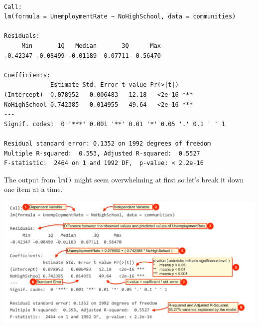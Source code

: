 \documentclass[]{article}
\begin{document}
\begin{verbatim}

Call:
lm(formula = UnemploymentRate ~ NoHighSchool, data = communities)

Residuals:
     Min       1Q   Median       3Q      Max 
-0.42347 -0.08499 -0.01189  0.07711  0.56470 

Coefficients:
             Estimate Std. Error t value Pr(>|t|)    
(Intercept)  0.078952   0.006483   12.18   <2e-16 ***
NoHighSchool 0.742385   0.014955   49.64   <2e-16 ***
---
Signif. codes:  0 '***' 0.001 '**' 0.01 '*' 0.05 '.' 0.1 ' ' 1

Residual standard error: 0.1352 on 1992 degrees of freedom
Multiple R-squared:  0.553, Adjusted R-squared:  0.5527 
F-statistic:  2464 on 1 and 1992 DF,  p-value: < 2.2e-16
\end{verbatim}

The output from \texttt{lm()} might seem overwhelming at first so let's break it down one item at a time.

\includegraphics{./img/lm.png}
\end{document}

